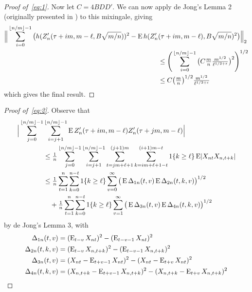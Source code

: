 \documentclass[11pt]{article}
\begin{document}
{\begin{proof}[Proof of~\eqref{eq:1}]
  Now let $C = 4 B D D'$.
  We can now apply de Jong's Lemma 2 (originally presented in
  \citealp{Mcl:75}) to this mixingale, giving
  \begin{align*}
    \Big \lVert \sum_{i=0}^{\lfloor n/m \rfloor - 1}
    \big(h(Z'_n(\tau + im, m - \ell, B \sqrt{m/n}))^2 -
    \operatorname{E} h(Z'_n&(\tau + im, m - \ell), B \sqrt{m/n})^2\big) \Big\rVert_2 \\
    &\leq \Bigg(\sum_{i=0}^{\lfloor n/m \rfloor - 1}
    \big(C \tfrac{m}{n} \tfrac{m^{1/2}}{\ell^{1/2 + \epsilon}}\big)^2 \Bigg)^{1/2} \\
    &\leq C \big(\tfrac{m}{n}\big)^{1/2} \tfrac{m^{1/2}}{\ell^{1/2 + \epsilon}}
  \end{align*}
  which gives the final result.
\end{proof}

\begin{proof}[Proof of~\eqref{eq:2}]
  Observe that
  \begin{align}
    \Big\lvert \notag
    \sum_{j=0}^{\lfloor n/m \rfloor - 1} & \sum_{i=j+1}^{\lfloor n/m \rfloor - 1}
    \operatorname{E} Z_{n}'(\tau + im, m - \ell) Z_{n}'(\tau + jm, m - \ell) \Big\rvert \\
    &\leq \tfrac{1}{n} \notag
    \sum_{j=0}^{\lfloor n/m \rfloor - 1} \sum_{i=j+1}^{\lfloor n/m \rfloor - 1}
    \sum_{t = j m + \ell + 1}^{(j+1) m} \sum_{k= i m + \ell + 1 - t}^{(i+1)m - t}
    1\{k \geq \ell\} \operatorname{E}\lvert X_{nt} X_{n,t+k}  \rvert\\ \label{eq:3}
    &\leq \tfrac{1}{n} \sum_{t = 1}^n \sum_{k = 0}^{n-t} 1\{k \geq \ell\}
    \sum_{v=0}^\infty  \big( \operatorname{E} \Delta_{1n}(t,v) \operatorname{E} \Delta_{2n}(t,k,v) \big)^{1/2}\\
    &\quad + \tfrac{1}{n} \sum_{t = 1}^n \sum_{k = 0}^{n-t} 1\{k \geq \ell\} \label{eq:4}
    \sum_{v=1}^\infty \big( \operatorname{E} \Delta_{3n}(t,v) \operatorname{E} \Delta_{4n}(t,k,v) \big)^{1/2}
  \end{align}
  by de Jong's Lemma 3, with
  \begin{align*}
    \Delta_{1n}(t,v) &= (\operatorname{E}_{t-v} X_{nt})^2 - (\operatorname{E}_{t-v-1} X_{nt})^2 \\
    \Delta_{2n}(t,k,v)&= (\operatorname{E}_{t-v}X_{n,t+k})^2 - (\operatorname{E}_{t-v-1} X_{n,t+k})^2 \\
    \Delta_{3n}(t,v) &=  (X_{nt} - \operatorname{E}_{t+v-1} X_{nt})^2 -  (X_{nt} - \operatorname{E}_{t+v} X_{nt})^2 \\
    \Delta_{4n}(t,k,v) &= (X_{n,t+k} - \operatorname{E}_{t+v-1} X_{n,t+k})^2 - (X_{n,t+k} - \operatorname{E}_{t+v} X_{n,t+k})^2
  \end{align*}


\end{proof}}
\end{document}
